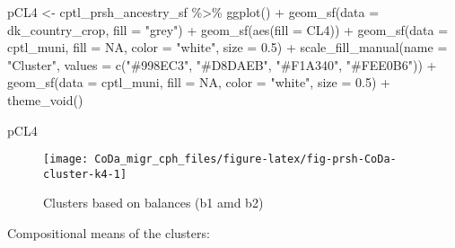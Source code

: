 \documentclass[
  12pt,
]{article}
\newenvironment{Shaded}{\begin{snugshade}}{\end{snugshade}}
\newcommand{\AttributeTok}[1]{\textcolor[rgb]{0.77,0.63,0.00}{#1}}
\newcommand{\ConstantTok}[1]{\textcolor[rgb]{0.00,0.00,0.00}{#1}}
\newcommand{\FloatTok}[1]{\textcolor[rgb]{0.00,0.00,0.81}{#1}}
\newcommand{\FunctionTok}[1]{\textcolor[rgb]{0.00,0.00,0.00}{#1}}
\newcommand{\NormalTok}[1]{#1}
\newcommand{\OtherTok}[1]{\textcolor[rgb]{0.56,0.35,0.01}{#1}}
\newcommand{\SpecialCharTok}[1]{\textcolor[rgb]{0.00,0.00,0.00}{#1}}
\newcommand{\StringTok}[1]{\textcolor[rgb]{0.31,0.60,0.02}{#1}}
\begin{document}
\begin{Shaded}
\begin{Highlighting}[]
\NormalTok{pCL4 }\OtherTok{\textless{}{-}}\NormalTok{ cptl\_prsh\_ancestry\_sf }\SpecialCharTok{\%\textgreater{}\%} 
  \FunctionTok{ggplot}\NormalTok{() }\SpecialCharTok{+}
  \FunctionTok{geom\_sf}\NormalTok{(}\AttributeTok{data =}\NormalTok{ dk\_country\_crop, }\AttributeTok{fill =} \StringTok{"grey"}\NormalTok{) }\SpecialCharTok{+}
  \FunctionTok{geom\_sf}\NormalTok{(}\FunctionTok{aes}\NormalTok{(}\AttributeTok{fill =}\NormalTok{ CL4)) }\SpecialCharTok{+}
  \FunctionTok{geom\_sf}\NormalTok{(}\AttributeTok{data =}\NormalTok{ cptl\_muni, }\AttributeTok{fill =} \ConstantTok{NA}\NormalTok{, }\AttributeTok{color =} \StringTok{"white"}\NormalTok{, }\AttributeTok{size =} \FloatTok{0.5}\NormalTok{) }\SpecialCharTok{+}
  \FunctionTok{scale\_fill\_manual}\NormalTok{(}\AttributeTok{name =} \StringTok{"Cluster"}\NormalTok{,}
                    \AttributeTok{values =} \FunctionTok{c}\NormalTok{(}\StringTok{"\#998EC3"}\NormalTok{,}
                               \StringTok{"\#D8DAEB"}\NormalTok{,}
                               \StringTok{"\#F1A340"}\NormalTok{,}
                               \StringTok{"\#FEE0B6"}\NormalTok{)) }\SpecialCharTok{+}
  \FunctionTok{geom\_sf}\NormalTok{(}\AttributeTok{data =}\NormalTok{ cptl\_muni, }\AttributeTok{fill =} \ConstantTok{NA}\NormalTok{, }\AttributeTok{color =} \StringTok{"white"}\NormalTok{, }\AttributeTok{size =} \FloatTok{0.5}\NormalTok{) }\SpecialCharTok{+}
  \FunctionTok{theme\_void}\NormalTok{()}
 
\NormalTok{pCL4}
\end{Highlighting}
\end{Shaded}

\begin{figure}[H]

{\centering \texttt{[image: CoDa\_migr\_cph\_files/figure-latex/fig-prsh-CoDa-cluster-k4-1]} 

}

\caption{Clusters based on balances (b1 amd b2)}\label{fig:fig-prsh-CoDa-cluster-k4}
\end{figure}

Compositional means of the clusters:
\end{document}
